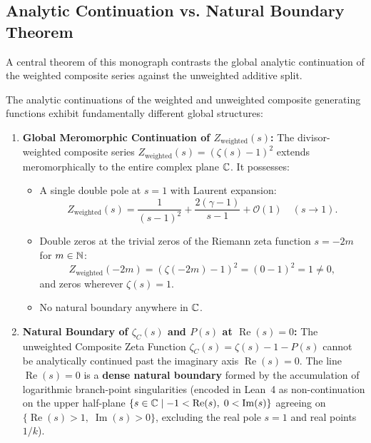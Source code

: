 \subsection{Analytic Continuation vs. Natural Boundary Theorem}

A central theorem of this monograph contrasts the global analytic continuation of the weighted composite series against the unweighted additive split.

\begin{theorem}
\label{thm:natural_boundary}
\leanok
The analytic continuations of the weighted and unweighted composite generating functions exhibit fundamentally different global structures:
\begin{enumerate}[label=(\alph*)]
  \item \textbf{Global Meromorphic Continuation of $Z_{\mathrm{weighted}}(s)$:}  
  The divisor-weighted composite series $Z_{\mathrm{weighted}}(s) = (\zeta(s) - 1)^2$ extends meromorphically to the entire complex plane $\mathbb{C}$. It possesses:
  \begin{itemize}
    \item A single double pole at $s = 1$ with Laurent expansion:
    \begin{equation}
    Z_{\mathrm{weighted}}(s) = \frac{1}{(s-1)^2} + \frac{2(\gamma - 1)}{s-1} + \mathcal{O}(1) \quad (s \to 1).
    \end{equation}
    \item Double zeros at the trivial zeros of the Riemann zeta function $s = -2m$ for $m \in \mathbb{N}$:
    $$Z_{\mathrm{weighted}}(-2m) = (\zeta(-2m) - 1)^2 = (0 - 1)^2 = 1 \neq 0,$$
    and zeros wherever $\zeta(s) = 1$.
    \item No natural boundary anywhere in $\mathbb{C}$.
  \end{itemize}
  \item \textbf{Natural Boundary of $\zeta_C(s)$ and $P(s)$ at $\operatorname{Re}(s) = 0$:}  
  The unweighted Composite Zeta Function $\zeta_C(s) = \zeta(s) - 1 - P(s)$ cannot be analytically continued past the imaginary axis $\operatorname{Re}(s) = 0$. The line $\operatorname{Re}(s) = 0$ is a \textbf{dense natural boundary} formed by the accumulation of logarithmic branch-point singularities (encoded in Lean~4 as non-continuation on the upper half-plane $\{s \in \mathbb{C} \mid -1 < \operatorname{Re}(s),\; 0 < \operatorname{Im}(s)\}$ agreeing on $\{\operatorname{Re}(s) > 1,\; \operatorname{Im}(s) > 0\}$, excluding the real pole $s = 1$ and real points $1/k$).
\end{enumerate}
\end{theorem}

